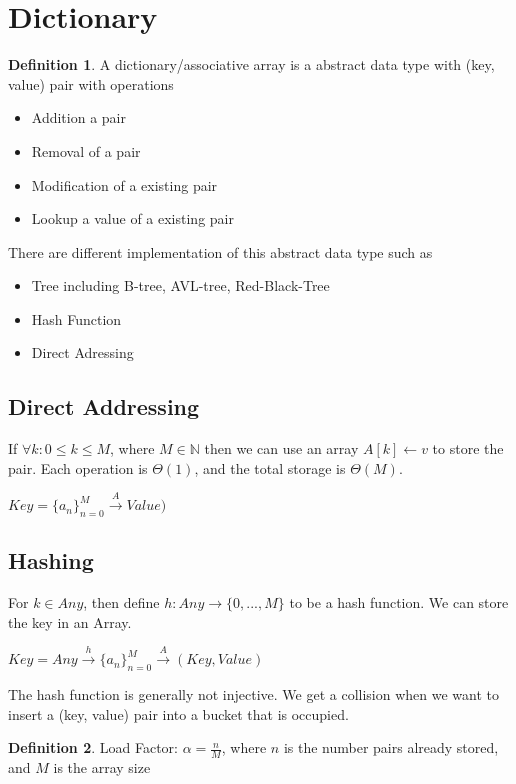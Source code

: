 \documentclass{article}
\theoremstyle{plain}
\theoremstyle{definition}
\newtheorem{defn}{Definition}
\begin{document}
\section{Dictionary}

\begin{defn}
    A dictionary/associative array is a abstract data type with (key, value) pair with
    operations
    \begin{itemize}
        \item Addition a pair
        \item Removal of a pair
        \item Modification of a existing pair
        \item Lookup a value of a existing pair
    \end{itemize}
\end{defn}

There are different implementation of this abstract data type such as
\begin{itemize}
    \item Tree including B-tree, AVL-tree, Red-Black-Tree
    \item Hash Function
    \item Direct Adressing
\end{itemize}

\subsection{Direct Addressing}
If $\forall k: 0\leq k\leq M$, where $M\in\mathbb{N}$ then we can use an
array $A[k]\leftarrow v$ to store the pair. Each operation is $\Theta(1)$, and
the total storage is $\Theta(M)$.

$Key = \{a_n\}^M_{n=0} \xrightarrow{A} Value)$

\subsection{Hashing}
For $k\in Any$, then define $h: Any\rightarrow \{0, ..., M\}$ to be a hash function.
We can store the key in an Array.

$Key = Any\xrightarrow{h}\{a_n\}^M_{n=0}\xrightarrow{A} (Key, Value)$

The hash function is generally not injective. We get a collision when we want to
insert a (key, value) pair into a bucket that is occupied.

\begin{defn}
    Load Factor: $\alpha = \frac{n}{M}$, where $n$ is the number pairs already stored,
    and $M$ is the array size
\end{defn}
\end{document}
